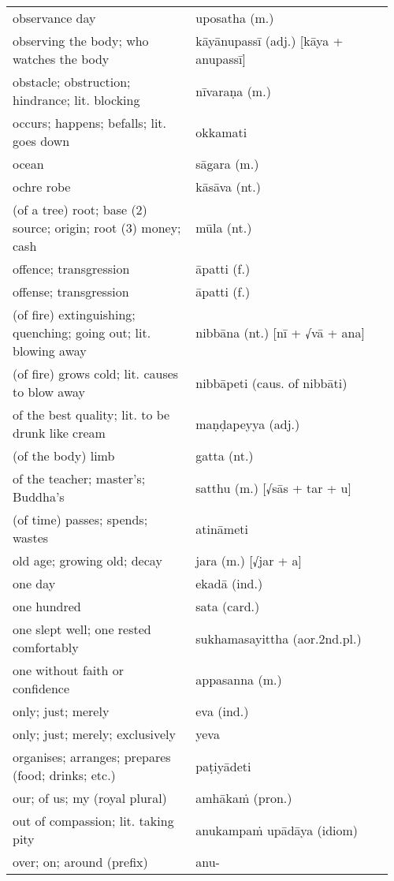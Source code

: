 \documentclass[a5paper]{memoir}
\begin{document}
\begin{longtable}{L{0.48\linewidth} L{0.48\linewidth} H}
observance day & uposatha (m.) & \\[0pt]
observing the body; who watches the body & kāyānupassī (adj.) [kāya + anupassī] & \\[0pt]
obstacle; obstruction; hindrance; lit. blocking & nīvaraṇa (m.) & \\[0pt]
occurs; happens; befalls; lit. goes down & okkamati & \\[0pt]
ocean & sāgara (m.) & \\[0pt]
ochre robe & kāsāva (nt.) & \\[0pt]
(of a tree) root; base (2) source; origin; root (3) money; cash & mūla (nt.) & \\[0pt]
offence; transgression & āpatti (f.) & \\[0pt]
offense; transgression & āpatti (f.) & \\[0pt]
(of fire) extinguishing; quenching; going out; lit. blowing away & nibbāna (nt.) [nī + √vā + ana] & \\[0pt]
(of fire) grows cold; lit. causes to blow away & nibbāpeti (caus. of nibbāti) & \\[0pt]
of the best quality; lit. to be drunk like cream & maṇḍapeyya (adj.) & \\[0pt]
(of the body) limb & gatta (nt.) & \\[0pt]
of the teacher; master's; Buddha's & satthu (m.) [√sās + tar + u] & \\[0pt]
(of time) passes; spends; wastes & atināmeti & \\[0pt]
old age; growing old; decay & jara (m.) [√jar + a] & \\[0pt]
one day & ekadā (ind.) & \\[0pt]
one hundred & sata (card.) & \\[0pt]
one slept well; one rested comfortably & sukhamasayittha (aor.2nd.pl.) & \\[0pt]
one without faith or confidence & appasanna (m.) & \\[0pt]
only; just; merely & eva (ind.) & \\[0pt]
only; just; merely; exclusively & yeva & \\[0pt]
organises; arranges; prepares (food; drinks; etc.) & paṭiyādeti & \\[0pt]
our; of us; my (royal plural) & amhākaṁ (pron.) & \\[0pt]
out of compassion; lit. taking pity & anukampaṁ upādāya (idiom) & \\[0pt]
over; on; around (prefix) & anu- & \\[0pt]

\end{longtable}
\end{document}
